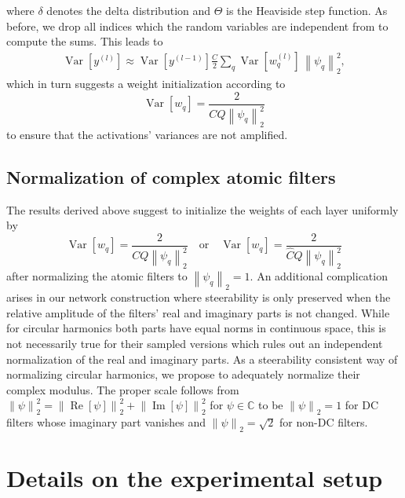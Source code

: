 \documentclass[10pt,twocolumn,letterpaper]{article}
\newcommand{\Var}{\operatorname{Var}}
\newcommand{\real}{\operatorname{Re}}
\newcommand{\imag}{\operatorname{Im}}
\newcommand{\norm}[1]{\left\lVert #1 \right\rVert}
\begin{document}
where $\delta$ denotes the delta distribution and $\Theta$ is the Heaviside step function.
As before, we drop all indices which the random variables are independent from to compute the sums. This leads to
\begin{equation*}
\begin{split}
	\Var\left[y^{(l)}\right]\approx\Var\left[y^{(l-1)}\right]\frac{C}{2}\sum\limits_q\Var\left[w_q^{(l)}\right]\,\norm{\psi_q}_2^2,
\end{split}
\end{equation*}
which in turn suggests a weight initialization according to
\begin{equation*}\label{eq:initializationForwardprop}
\Var\left[w_q\right]=\frac{2}{CQ\norm{\psi_q}_2^2}
\end{equation*}
to ensure that the activations' variances are not amplified.

\vspace{3ex}
\subsection{Normalization of complex atomic filters}

The results derived above suggest to initialize the weights of each layer uniformly by
\begin{equation*}
	\Var\left[w_q\right]=\frac{2}{CQ\norm{\psi_q}_2^2} \quad \text{or} \quad \Var\left[w_q\right]=\frac{2}{\hat{C}Q\norm{\psi_q}_2^2}
\end{equation*}
after normalizing the atomic filters to $\norm{\psi_q}_2=1.$
An additional complication arises in our network construction where steerability is only preserved when the relative amplitude of the filters' real and imaginary parts is not changed.
While for circular harmonics both parts have equal norms in continuous space, this is not necessarily true for their sampled versions which rules out an independent normalization of the real and imaginary parts.
As a steerability consistent way of normalizing circular harmonics, we propose to adequately normalize their complex modulus.
The proper scale follows from $\norm{\psi}_2^2=\norm{\real\left[\psi\right]}_2^2+\norm{\imag\left[\psi\right]}_2^2$ for $\psi\in\mathbb{C}$ to be $\norm{\psi}_2=1$ for DC filters whose imaginary part vanishes and $\norm{\psi}_2=\sqrt{2}$ for non-DC filters.





\section{Details on the experimental setup}\label{apx:Experiments}
\end{document}
